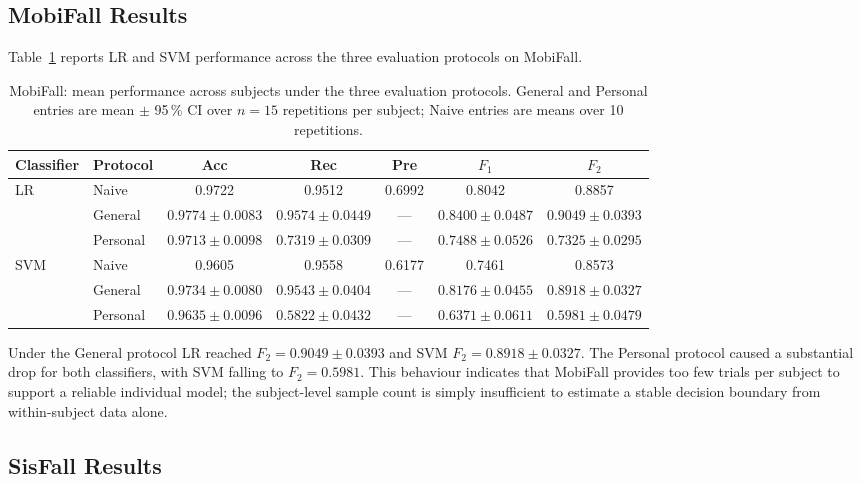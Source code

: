 \documentclass[onluarkali,ingilizce,yukseklisans,karton,LisansustuEgitim]{itutez}
\providecommand{\1}{\mathbf{1}}
\begin{document}
\subsection{MobiFall Results}
\label{subsubsec:mobifall_results}

Table~\ref{tab:mobifall_results} reports LR and SVM performance across the three evaluation protocols on MobiFall.

\begin{table}[h!]
\centering
\caption{MobiFall: mean performance across subjects under the three evaluation
  protocols.  General and Personal entries are mean $\pm$ 95\,\% CI over
  $n = 15$ repetitions per subject; Naive entries are means over 10 repetitions.}
\label{tab:mobifall_results}
\setlength{\tabcolsep}{3pt}\footnotesize
\begin{tabular}{llccccc}
\toprule
\textbf{Classifier} & \textbf{Protocol}
  & \textbf{Acc} & \textbf{Rec} & \textbf{Pre}
  & \textbf{$F_1$} & \textbf{$F_2$} \\
\midrule
\multirow{3}{*}{LR}
 & Naive
   & 0.9722 & 0.9512 & 0.6992 & 0.8042 & 0.8857 \\
 & General
   & $0.9774 \pm 0.0083$ & $0.9574 \pm 0.0449$ & ---
   & $0.8400 \pm 0.0487$ & $0.9049 \pm 0.0393$ \\
 & Personal
   & $0.9713 \pm 0.0098$ & $0.7319 \pm 0.0309$ & ---
   & $0.7488 \pm 0.0526$ & $0.7325 \pm 0.0295$ \\
\midrule
\multirow{3}{*}{SVM}
 & Naive
   & 0.9605 & 0.9558 & 0.6177 & 0.7461 & 0.8573 \\
 & General
   & $0.9734 \pm 0.0080$ & $0.9543 \pm 0.0404$ & ---
   & $0.8176 \pm 0.0455$ & $0.8918 \pm 0.0327$ \\
 & Personal
   & $0.9635 \pm 0.0096$ & $0.5822 \pm 0.0432$ & ---
   & $0.6371 \pm 0.0611$ & $0.5981 \pm 0.0479$ \\
\bottomrule
\end{tabular}
\end{table}

Under the General protocol LR reached $F_2 = 0.9049 \pm 0.0393$ and SVM $F_2 = 0.8918 \pm 0.0327$. The Personal protocol caused a substantial drop for both classifiers, with SVM falling to $F_2 = 0.5981$. This behaviour indicates that MobiFall provides too few trials per subject to support a reliable individual model; the subject-level sample count is simply insufficient to estimate a stable decision boundary from within-subject data alone.

\subsection{SisFall Results}
\label{subsubsec:sisfall_results}
\end{document}
